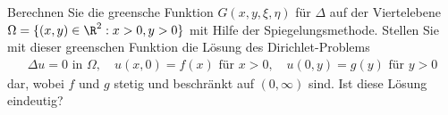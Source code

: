 
\begin{exercise}

Berechnen Sie die greensche Funktion $G(x,y,\xi,\eta)$ für $\Delta$ auf der Viertelebene
$\Omega = \{(x,y) \in \R^2: x > 0, y > 0\}$ mit Hilfe der Spiegelungsmethode.
Stellen Sie mit dieser greenschen Funktion die Lösung des Dirichlet-Problems
\begin{align*}
  \Delta u = 0 \text{ in } \Omega, \quad u(x,0) = f(x) \text{ für } x > 0,
  \quad u(0,y) = g(y) \text{ für } y > 0
\end{align*}
dar, wobei $f$ und $g$ stetig und beschränkt auf $(0,\infty)$ sind. Ist diese Lösung eindeutig?
\end{exercise}


\begin{solution}
\phantom{}

\end{solution}

